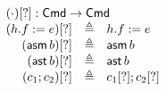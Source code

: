 \documentclass{article}
\newcommand{\Cmd}{\mathsf{Cmd}}
\newcommand{\matches}{\mathsf{matches}}
\newcommand{\action}{\mathsf{action}}
\newcommand{\keys}{\mathsf{keys}}
\newcommand{\data}{\mathsf{data}}
\newcommand{\assert}{\mathop{\mathsf{ast}}}
\newcommand{\assume}{\mathop{\mathsf{asm}}}
\newcommand{\apply}{\mathsf{apply}}
\newcommand{\choiceop}{\rotatebox[origin=c]{90}{$\sqsubset\!\!\!\sqsupset$}}
\newcommand{\choice}{\mathbin{\choiceop}}
\DeclareMathOperator*{\bigchoice}{\scalerel*{\choiceop}{\sum}}
\newcommand{\havoc}[1]{\mathop{\mathsf{hvc}}#1}
\newcommand{\SKIP}{\mathsf{skip}}
\newcommand{\instr}{[?]}
\theoremstyle{plain}
\theoremstyle{definition}
\theoremstyle{remark}
\begin{document}
\begin{figure}[htp]
\[\begin{array}{r >{\triangleq}cl}
  \multicolumn{3}{l}{(\cdot)\instr : \Cmd \to \Cmd} \\
  (h.f := e)\instr && h.f := e \\
  (\assume b)\instr && \assume b \\
  (\assert b)\instr && \assert b\\
  (c_1;c_2)\instr && c_1\instr;c_2\instr\\

\end{array}\]
\end{figure}
\end{document}
